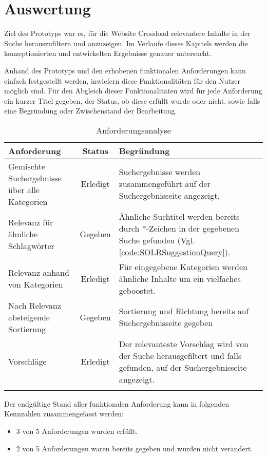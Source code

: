 \chapter{Auswertung}
\label{ch:evaluation}
Ziel des Prototyps war es, für die Website Crossload relevantere Inhalte in der Suche herauszufiltern und anzuzeigen.
Im Verlaufe dieses Kapitels werden die konzeptionierten und entwickelten Ergebnisse genauer untersucht.

Anhand des Prototyps und den erhobenen funktionalen Anforderungen kann einfach festgestellt werden, inwiefern diese Funktionalitäten für den Nutzer möglich sind.
Für den Abgleich dieser Funktionalitäten wird für jede Anforderung ein kurzer Titel gegeben, der Status, ob diese erfüllt wurde oder nicht, sowie falls eine Begründung oder Zwischenstand der Bearbeitung.

\begin{longtable}{p{}|c|p{}}
  \label{tab:requirements}\\
  \textbf{Anforderung} & \textbf{Status} & \textbf{Begründung} \\
  \hline
  \hline
  Gemischte Suchergebnisse über alle Kategorien & Erledigt & Suchergebnisse werden zusammengeführt auf der Suchergebnisseite angezeigt. \\
  \hline

  Relevanz für ähnliche Schlagwörter & Gegeben & Ähnliche Suchtitel werden bereits durch *-Zeichen in der gegebenen Suche gefunden (Vgl. \ref{code:SOLRSuggestionQuery}). \\
  \hline

  Relevanz anhand von Kategorien & Erledigt & Für eingegebene Kategorien werden ähnliche Inhalte um ein vielfaches geboostet. \\
  \hline

  Nach Relevanz absteigende Sortierung & Gegeben & Sortierung und Richtung bereits auf Suchergebnisseite gegeben \\
  \hline

  Vorschläge & Erledigt & Der relevanteste Vorschlag wird von der Suche herausgefiltert und falls gefunden, auf der Suchergebnisseite angezeigt. \\
  \caption{Anforderungsanalyse}
\end{longtable}

Der endgültige Stand aller funktionalen Anforderung kann in folgenden Kennzahlen zusammengefasst werden:
\begin{itemize}
  \item 3 von 5 Anforderungen wurden erfüllt.
  \item 2 von 5 Anforderungen waren bereits gegeben und wurden nicht verändert.
\end{itemize}
